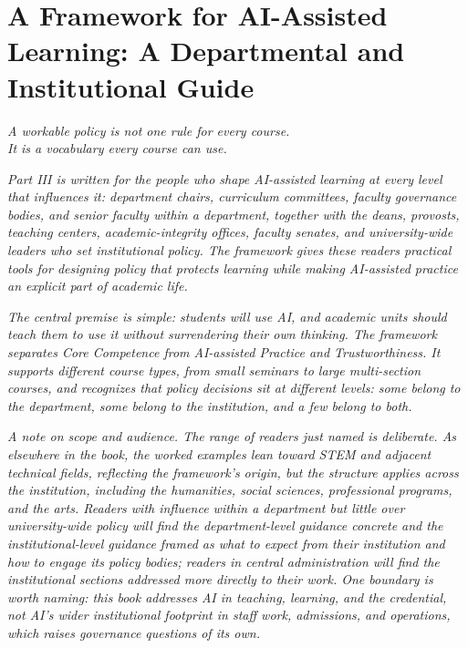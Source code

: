 \documentclass{SIAMbook2023}
\newcommand{\bookepigraph}[1]{%
  \begin{center}%
    \begin{minipage}{0.78\textwidth}%
      \centering\itshape #1%
    \end{minipage}%
  \end{center}%
  \vspace{0.6em}%
}
\begin{document}
\part{A Framework for AI-Assisted Learning: A Departmental and Institutional Guide}
\label{part:institutional}%

\bookepigraph{A workable policy is not one rule for every course.\\It is a vocabulary every course can use.}

\textit{Part III is written for the people who shape AI-assisted learning at every level that influences it: department chairs, curriculum committees, faculty governance bodies, and senior faculty within a department, together with the deans, provosts, teaching centers, academic-integrity offices, faculty senates, and university-wide leaders who set institutional policy. The framework gives these readers practical tools for designing policy that protects learning while making AI-assisted practice an explicit part of academic life.}

\textit{The central premise is simple: students will use AI, and academic units should teach them to use it without surrendering their own thinking. The framework separates Core Competence from AI-assisted Practice and Trustworthiness. It supports different course types, from small seminars to large multi-section courses, and recognizes that policy decisions sit at different levels: some belong to the department, some belong to the institution, and a few belong to both.}

\textit{A note on scope and audience. The range of readers just named is deliberate. As elsewhere in the book, the worked examples lean toward STEM and adjacent technical fields, reflecting the framework's origin, but the structure applies across the institution, including the humanities, social sciences, professional programs, and the arts. Readers with influence within a department but little over university-wide policy will find the department-level guidance concrete and the institutional-level guidance framed as what to expect from their institution and how to engage its policy bodies; readers in central administration will find the institutional sections addressed more directly to their work. One boundary is worth naming: this book addresses AI in teaching, learning, and the credential, not AI's wider institutional footprint in staff work, admissions, and operations, which raises governance questions of its own.}
\end{document}
